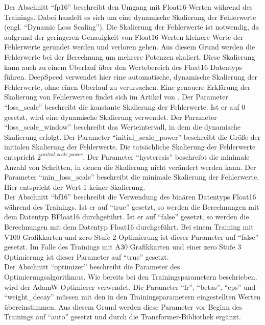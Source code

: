 Der Abschnitt \enquote{fp16} beschreibt den Umgang mit Float16-Werten während des Trainings.
Dabei handelt es sich um eine dynamische Skalierung der Fehlerwerte (engl. \enquote{Dynamic Loss Scaling}).
Die Skalierung der Fehlerwerte ist notwendig, da aufgrund der geringeren Genauigkeit von Float16-Werten kleinere Werte der Fehlerwerte gerundet werden und verloren gehen.
Aus diesem Grund werden die Fehlerwerte bei der Berechnung um mehrere Potenzen skaliert.
Diese Skalierung kann auch zu einem Überlauf über den Wertebereich des Float16 Datentyps führen.
DeepSpeed verwendet hier eine automatische, dynamische Skalierung der Fehlerwerte, ohne einen Überlauf zu verursachen.
Eine genauere Erklärung der Skalierung von Fehlerwerten findet sich im Artikel von \citet{lossscale}.
Der Parameter \enquote{loss\_scale} beschreibt die konstante Skalierung der Fehlerwerte.
Ist er auf $0$ gesetzt, wird eine dynamische Skalierung verwendet.
Der Parameter \enquote{loss\_scale\_window} beschreibt das Werteintervall, in dem die dynamische Skalierung erfolgt.
Der Parameter \enquote{initial\_scale\_power} beschreibt die Größe der initialen Skalierung der Fehlerwerte.
Die tatsächliche Skalierung der Fehlerwerte entspricht $2^{initial\_scale\_power}$.
Der Parameter \enquote{hysteresis} beschreibt die minimale Anzahl von Schritten, in denen die Skalierung nicht verändert werden kann.
Der Parameter \enquote{min\_loss\_scale} beschreibt die minimale Skalierung der Fehlerwerte.
Hier entspricht der Wert $1$ keiner Skalierung.\\

Der Abschnitt \enquote{bf16} beschreibt die Verwendung des binären Datentyps Float16 während des Trainings.
Ist er auf \enquote{true} gesetzt, so werden die Berechnungen mit dem Datentyp BFloat16 durchgeführt.
Ist er auf \enquote{false} gesetzt, so werden die Berechnungen mit dem Datentyp Float16 durchgeführt.
Bei einem Training mit V100 Grafikkarten und \ac{zero} Stufe 2 Optimierung ist dieser Parameter auf \enquote{false} gesetzt.
Im Falle des Trainings mit A30 Grafikkarten und einer \ac{zero} Stufe 3 Optimierung ist dieser Parameter auf \enquote{true} gesetzt.\\

Der Abschnitt \enquote{optimizer} beschreibt die Parameter des Optimierungsalgorithmus. Wie bereits bei den Trainingsparametern beschrieben, wird der AdamW-Optimierer verwendet.
Die Parameter \enquote{lr}, \enquote{betas}, \enquote{eps} und \enquote{weight\_decay} müssen mit den in den Trainingsparametern eingestellten Werten übereinstimmen.
Aus diesem Grund werden diese Parameter vor Beginn des Trainings auf \enquote{auto} gesetzt und durch die Transformer-Bibliothek ergänzt.\\

